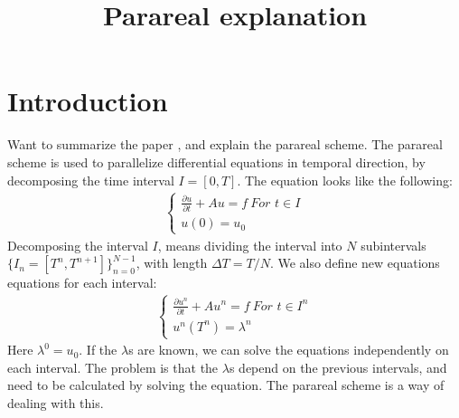\documentclass[11pt,a4paper]{article}
\title{Parareal explanation}
\begin{document}
\maketitle
\section{Introduction}
Want to summarize the paper \cite{lions2001resolution}, and explain the parareal scheme. The parareal scheme is used to parallelize differential equations in temporal direction, by decomposing the time interval $I=[0,T]$. The equation looks like the following:
\begin{align}
\left\{
     \begin{array}{lr}
		\frac{\partial u}{\partial t} + Au = f \ 				\textit{For $t \in I$} \\
		u(0)=u_0
	\end{array}
   \right.			
\end{align} 
Decomposing the interval $I$, means dividing the interval into $N$ subintervals $\{I_n = [T^{n},T^{n+1}]\}_{n=0}^{N-1}$, with length $\Delta T = T/N$. We also define new equations equations for each interval:
\begin{align}
\left\{
     \begin{array}{lr}
		\frac{\partial u^n}{\partial t} + Au^n = f \ 				\textit{For $t \in I^n$} \\
		u^n(T^n)=\lambda^n
	\end{array}
\right.	
\end{align}
Here $\lambda^0=u_0$. If the $\lambda$s are known, we can solve the equations independently on each interval. The problem is that the $\lambda$s depend on the previous intervals, and need to be calculated by solving the equation. The parareal scheme is a way of dealing with this.
\end{document}
